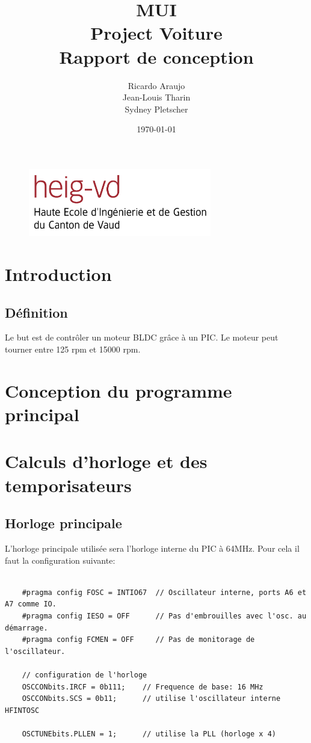 \documentclass[fleqn, 11pt, a4paper]{article}
\author{Ricardo Araujo\\
  Jean-Louis Tharin\\
  Sydney Pletscher}
\title{MUI\\
Project Voiture\\
 Rapport de conception}
\date{\today}
\begin{document}
\maketitle
\vspace{8cm}
\begin{figure}[H]
\includegraphics[width=8cm]{heig-vd_logo_couleur_format_jpg}
\centering
\end{figure}

\newpage

\tableofcontents

\newpage

\section{Introduction}
	\subsection{Définition}
	Le but est de contrôler un moteur BLDC grâce à un PIC.
	Le moteur peut tourner entre 125 rpm et 15000 rpm.

	
	
\section{Conception du programme principal}

\section{Calculs d'horloge et des temporisateurs}
  \subsection{Horloge principale}
  L'horloge principale utilisée sera l'horloge interne du PIC à 64MHz.
  Pour cela il faut la configuration suivante:
  \begin{lstlisting}

    #pragma config FOSC = INTIO67  // Oscillateur interne, ports A6 et A7 comme IO.
    #pragma config IESO = OFF      // Pas d'embrouilles avec l'osc. au démarrage.
    #pragma config FCMEN = OFF     // Pas de monitorage de l'oscillateur.

    // configuration de l'horloge
    OSCCONbits.IRCF = 0b111;    // Frequence de base: 16 MHz
    OSCCONbits.SCS = 0b11;      // utilise l'oscillateur interne HFINTOSC
    
    OSCTUNEbits.PLLEN = 1;      // utilise la PLL (horloge x 4)    
  
  \end{lstlisting}
  
\end{document}
